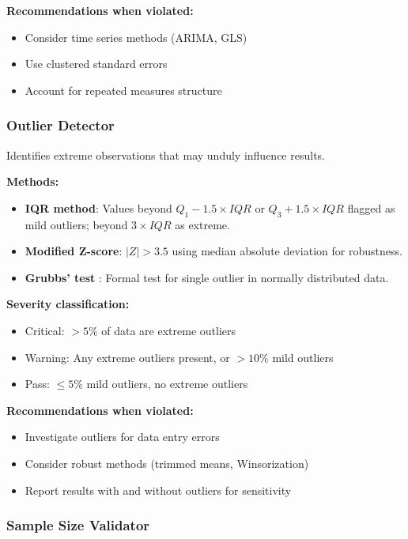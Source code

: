 \documentclass[article]{jss}
\begin{document}
\textbf{Recommendations when violated:}
\begin{itemize}
\item Consider time series methods (ARIMA, GLS)
\item Use clustered standard errors
\item Account for repeated measures structure
\end{itemize}

\subsubsection{Outlier Detector}

Identifies extreme observations that may unduly influence results.

\textbf{Methods:}
\begin{itemize}
\item \textbf{IQR method}: Values beyond $Q_1 - 1.5 \times IQR$ or $Q_3 + 1.5 \times IQR$ flagged as mild outliers; beyond $3 \times IQR$ as extreme.
\item \textbf{Modified Z-score}: $|Z| > 3.5$ using median absolute deviation for robustness.
\item \textbf{Grubbs' test} \citep{grubbs1969procedures}: Formal test for single outlier in normally distributed data.
\end{itemize}

\textbf{Severity classification:}
\begin{itemize}
\item Critical: $> 5\%$ of data are extreme outliers
\item Warning: Any extreme outliers present, or $> 10\%$ mild outliers
\item Pass: $\leq 5\%$ mild outliers, no extreme outliers
\end{itemize}

\textbf{Recommendations when violated:}
\begin{itemize}
\item Investigate outliers for data entry errors
\item Consider robust methods (trimmed means, Winsorization)
\item Report results with and without outliers for sensitivity
\end{itemize}

\subsubsection{Sample Size Validator}
\end{document}
